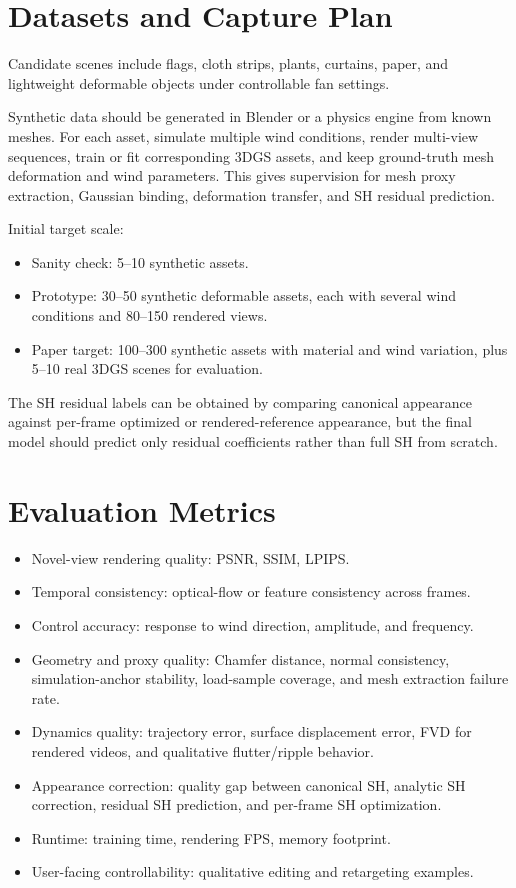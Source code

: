 \documentclass[11pt]{article}
\begin{document}
\section{Datasets and Capture Plan}

Candidate scenes include flags, cloth strips, plants, curtains, paper, and lightweight deformable objects under controllable fan settings.

Synthetic data should be generated in Blender or a physics engine from known meshes. For each asset, simulate multiple wind conditions, render multi-view sequences, train or fit corresponding 3DGS assets, and keep ground-truth mesh deformation and wind parameters. This gives supervision for mesh proxy extraction, Gaussian binding, deformation transfer, and SH residual prediction.

Initial target scale:

\begin{itemize}
  \item Sanity check: 5--10 synthetic assets.
  \item Prototype: 30--50 synthetic deformable assets, each with several wind conditions and 80--150 rendered views.
  \item Paper target: 100--300 synthetic assets with material and wind variation, plus 5--10 real 3DGS scenes for evaluation.
\end{itemize}

The SH residual labels can be obtained by comparing canonical appearance against per-frame optimized or rendered-reference appearance, but the final model should predict only residual coefficients rather than full SH from scratch.

\section{Evaluation Metrics}

\begin{itemize}
  \item Novel-view rendering quality: PSNR, SSIM, LPIPS.
  \item Temporal consistency: optical-flow or feature consistency across frames.
  \item Control accuracy: response to wind direction, amplitude, and frequency.
  \item Geometry and proxy quality: Chamfer distance, normal consistency, simulation-anchor stability, load-sample coverage, and mesh extraction failure rate.
  \item Dynamics quality: trajectory error, surface displacement error, FVD for rendered videos, and qualitative flutter/ripple behavior.
  \item Appearance correction: quality gap between canonical SH, analytic SH correction, residual SH prediction, and per-frame SH optimization.
  \item Runtime: training time, rendering FPS, memory footprint.
  \item User-facing controllability: qualitative editing and retargeting examples.
\end{itemize}
\end{document}
